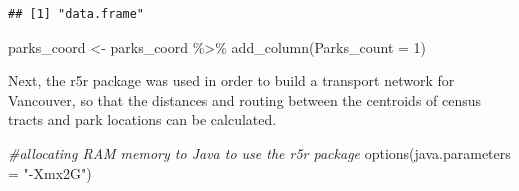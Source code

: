 \documentclass[
]{article}
\newenvironment{Shaded}{\begin{snugshade}}{\end{snugshade}}
\newcommand{\AttributeTok}[1]{\textcolor[rgb]{0.77,0.63,0.00}{#1}}
\newcommand{\CommentTok}[1]{\textcolor[rgb]{0.56,0.35,0.01}{\textit{#1}}}
\newcommand{\DecValTok}[1]{\textcolor[rgb]{0.00,0.00,0.81}{#1}}
\newcommand{\FunctionTok}[1]{\textcolor[rgb]{0.00,0.00,0.00}{#1}}
\newcommand{\NormalTok}[1]{#1}
\newcommand{\OtherTok}[1]{\textcolor[rgb]{0.56,0.35,0.01}{#1}}
\newcommand{\SpecialCharTok}[1]{\textcolor[rgb]{0.00,0.00,0.00}{#1}}
\newcommand{\StringTok}[1]{\textcolor[rgb]{0.31,0.60,0.02}{#1}}
\begin{document}
\begin{verbatim}
## [1] "data.frame"
\end{verbatim}

\begin{Shaded}
\end{Shaded}

\begin{Shaded}
\begin{Highlighting}[]
\NormalTok{parks\_coord }\OtherTok{\textless{}{-}}\NormalTok{ parks\_coord }\SpecialCharTok{\%\textgreater{}\%}
  \FunctionTok{add\_column}\NormalTok{(}\AttributeTok{Parks\_count =} \DecValTok{1}\NormalTok{)}
\end{Highlighting}
\end{Shaded}

Next, the r5r package was used in order to build a transport network for
Vancouver, so that the distances and routing between the centroids of
census tracts and park locations can be calculated.

\begin{Shaded}
\begin{Highlighting}[]
\CommentTok{\#allocating RAM memory to Java to use the r5r package}
\FunctionTok{options}\NormalTok{(}\AttributeTok{java.parameters =} \StringTok{"{-}Xmx2G"}\NormalTok{)}
\end{Highlighting}
\end{Shaded}
\end{document}
